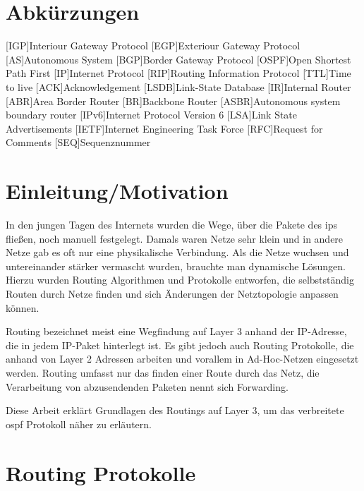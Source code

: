 \documentclass[11pt,a4paper,final]{article}
\begin{document}
\section*{Abkürzungen}
\begin{acronym}
		[IGP]{Interiour Gateway Protocol}
		[EGP]{Exteriour Gateway Protocol}
		[AS]{Autonomous System}
		[BGP]{Border Gateway Protocol}
		{Open Shortest Path First}
		[IP]{Internet Protocol}
		[RIP]{Routing Information Protocol}
		[TTL]{Time to live}
		[ACK]{Acknowledgement}
		{Link-State Database}
		[IR]{Internal Router}
		[ABR]{Area Border Router}
		[BR]{Backbone Router}
		{Autonomous system boundary router}
		{Internet Protocol Version 6}
		[LSA]{Link State Advertisements}
		{Internet Engineering Task Force}
		[RFC]{Request for Comments}
		[SEQ]{Sequenznummer}
\end{acronym}
\newpage
\setcounter{page}{1}

\section{Einleitung/Motivation}
In den jungen Tagen des Internets wurden die Wege, über die Pakete des \ac{ip}s fließen, noch manuell festgelegt.
Damals waren Netze sehr klein und in andere Netze gab es oft nur eine physikalische Verbindung.
Als die Netze wuchsen und untereinander stärker vermascht wurden, brauchte man dynamische Lösungen.
Hierzu wurden Routing Algorithmen und Protokolle entworfen, die selbstständig Routen durch Netze finden und sich Änderungen der Netztopologie anpassen können.

Routing bezeichnet meist eine Wegfindung auf Layer 3 anhand der IP-Adresse, die in jedem IP-Paket hinterlegt ist.
Es gibt jedoch auch Routing Protokolle, die anhand von Layer 2 Adressen arbeiten und vorallem in Ad-Hoc-Netzen eingesetzt werden.
Routing umfasst nur das finden einer Route durch das Netz, die Verarbeitung von abzusendenden Paketen nennt sich Forwarding.

Diese Arbeit erklärt Grundlagen des Routings auf Layer 3, um das verbreitete \ac{ospf} Protokoll näher zu erläutern.
\newpage
\section{Routing Protokolle}
\end{document}
